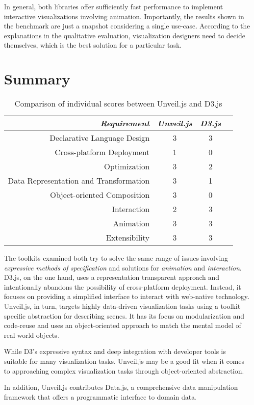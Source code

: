 In general, both libraries offer sufficiently fast performance to implement interactive visualizations involving animation. Importantly, the results shown in the benchmark are just a snapshot considering a single use-case. According to the explanations in the qualitative evaluation, visualization designers need to decide themselves, which is the best solution for a particular task.

\section{Summary}

\begin{table}
\caption{Comparison of individual scores between Unveil.js and D3.js}
\label{tab:comparison}
\centering
\setlength{\tabcolsep}{5mm} %
\def\arraystretch{1.0} %
\begin{tabular}{|r||c|c|c|} \hline
\emph{Requirement} & \emph{Unveil.js} & \emph{D3.js}\\
\hline\hline
Declarative Language Design & 3 & 3\\
\hline
Cross-platform Deployment & 1 & 0\\
\hline
Optimization & 3 & 2\\
\hline
Data Representation and Transformation & 3 & 1 \\
\hline
Object-oriented Composition & 3 & 0 \\
\hline
Interaction & 2 & 3 \\
\hline
Animation & 3 & 3 \\
\hline
Extensibility & 3 & 3 \\
\hline
\end{tabular}
\end{table}

The toolkits examined both try to solve the same range of issues involving \emph{expressive methods of specification} and solutions for \emph{animation} and \emph{interaction}. D3.js, on the one hand, uses a representation transparent approach and intentionally abandons the possibility of cross-platform deployment. Instead, it focuses on providing a simplified interface to interact with web-native technology. Unveil.js, in turn, targets highly data-driven visualization tasks using a toolkit specific abstraction for describing scenes. It has its focus on modularization and code-reuse and uses an object-oriented approach to match the mental model of real world objects. 




While D3's expressive syntax and deep integration with developer tools is suitable for many visualization tasks, Unveil.js may be a good fit when it comes to approaching complex visualization tasks through object-oriented abstraction.

In addition, Unveil.js contributes Data.js, a comprehensive data manipulation framework that offers a programmatic interface to domain data.